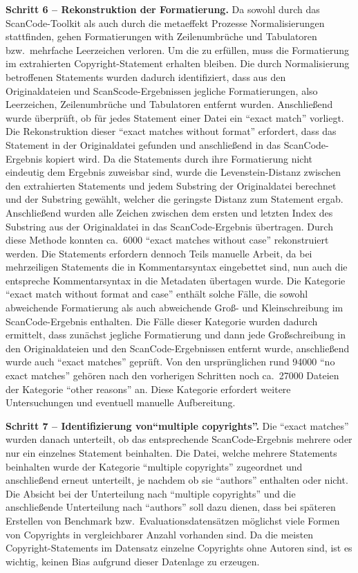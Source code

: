 \textbf{Schritt 6 -- Rekonstruktion der Formatierung.}
Da sowohl durch das ScanCode-Toolkit als auch durch die metaeffekt Prozesse Normalisierungen stattfinden, gehen Formatierungen with Zeilenumbrüche und Tabulatoren bzw.\ mehrfache Leerzeichen verloren.
Um die  zu erfüllen, muss die Formatierung im extrahierten Copyright-Statement erhalten bleiben.
Die durch Normalisierung betroffenen Statements wurden dadurch identifiziert, dass aus den Originaldateien und ScanScode-Ergebnissen jegliche Formatierungen, also Leerzeichen, Zeilenumbrüche und Tabulatoren entfernt wurden.
Anschließend wurde überprüft, ob für jedes Statement einer Datei ein \enquote{exact match} vorliegt.
Die Rekonstruktion dieser \enquote{exact matches without format} erfordert, dass das Statement in der Originaldatei gefunden und anschließend in das ScanCode-Ergebnis kopiert wird.
Da die Statements durch ihre Formatierung nicht eindeutig dem Ergebnis zuweisbar sind, wurde die Levenstein-Distanz zwischen den extrahierten Statements und jedem Substring der Originaldatei berechnet und der Substring gewählt, welcher die geringste Distanz zum Statement ergab.
Anschließend wurden alle Zeichen zwischen dem ersten und letzten Index des Substring aus der Originaldatei in das ScanCode-Ergebnis übertragen.
Durch diese Methode konnten ca.\ \num{6000} \enquote{exact matches without case} rekonstruiert werden.
Die Statements erfordern dennoch Teils manuelle Arbeit, da bei mehrzeiligen Statements die in Kommentarsyntax eingebettet sind, nun auch die entspreche Kommentarsyntax in die Metadaten übertagen wurde.
Die Kategorie \enquote{exact match without format and case} enthält solche Fälle, die sowohl abweichende Formatierung als auch abweichende Groß- und Kleinschreibung im ScanCode-Ergebnis enthalten.
Die Fälle dieser Kategorie wurden dadurch ermittelt, dass zunächst jegliche Formatierung und dann jede Großschreibung in den Originaldateien und den ScanCode-Ergebnissen entfernt wurde, anschließend wurde auch \enquote{exact matches} geprüft.
Von den ursprünglichen rund \num{94000} \enquote{no exact matches} gehören nach den vorherigen Schritten noch ca.\ \num{27000} Dateien der Kategorie \enquote{other reasons} an.
Diese Kategorie erfordert weitere Untersuchungen und eventuell manuelle Aufbereitung.

\textbf{Schritt 7 -- Identifizierung von\enquote{multiple copyrights}.}
Die \enquote{exact matches} wurden danach unterteilt, ob das entsprechende ScanCode-Ergebnis mehrere oder nur ein einzelnes Statement beinhalten.
Die Datei, welche mehrere Statements beinhalten wurde der Kategorie \enquote{multiple copyrights} zugeordnet und anschließend erneut unterteilt, je nachdem ob sie \enquote{authors} enthalten oder nicht.
Die Absicht bei der Unterteilung nach \enquote{multiple copyrights} und die anschließende Unterteilung nach \enquote{authors} soll dazu dienen, dass bei späteren Erstellen von Benchmark bzw.\ Evaluationsdatensätzen möglichst viele Formen von Copyrights in vergleichbarer Anzahl vorhanden sind.
Da die meisten Copyright-Statements im Datensatz einzelne Copyrights ohne Autoren sind, ist es wichtig, keinen Bias aufgrund dieser Datenlage zu erzeugen.


